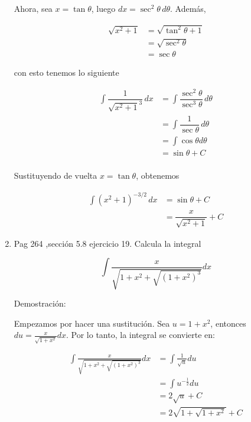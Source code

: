 \documentclass{report}
\begin{document}
\begin{enumerate}
        Ahora, sea $x = \tan \theta$, luego $dx= \sec^2\theta\,d\theta$. Además, 
        
        \begin{align*}
            \sqrt{x^2+1} &= \sqrt{\tan^2\theta +1}\\
            &= \sqrt{\sec^2\theta}\\
            &= \sec \theta
        \end{align*}
        
        con esto tenemos lo siguiente
        
        \begin{align*}
            \int \dfrac{1}{\sqrt{x^2+1}^3}\,dx &= \int \dfrac{\sec^2\theta}{\sec^3\theta}\,d\theta\\
            &= \int \dfrac{1}{\sec\theta}\,d\theta\\
            &= \int \cos\theta d\theta\\
            &= \sin \theta + C\\
        \end{align*}
        
        Sustituyendo de vuelta $x = \tan \theta$, obtenemos 
        
        \begin{align*}
            \int\left(x^{2}+1\right)^{-3 / 2} \, dx &= \sin \theta + C\\
            &= \dfrac{x}{\sqrt{x^2+1}} + C
        \end{align*}
        
        \item Pag 264 ,sección 5.8 ejercicio 19. Calcula la integral
        
        $$\int \frac{x}{\sqrt{1+x^{2}+\sqrt{\left(1+x^{2}\right)^{3}}}} d x$$
        
        Demostración:
        
        Empezamos por hacer una sustitución. Sea $u = 1+x^{2}$, entonces $du = \frac{x}{\sqrt{1+x^{2}}} dx$. Por lo tanto, la integral se convierte en:
        
        \begin{align*}
        \int \frac{x}{\sqrt{1+x^{2}+\sqrt{\left(1+x^{2}\right)^{3}}}} d x &= \int \frac{1}{\sqrt{u}} d u\\
        &= \int u^{-\frac{1}{2}} d u\\
        &= 2\sqrt{u} + C\\
        &= 2\sqrt{1+\sqrt{1+x^{2}}} + C
        \end{align*}
        

\end{enumerate}
\end{document}
